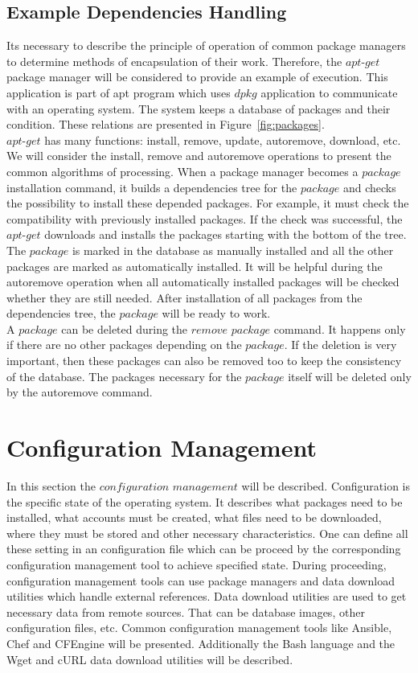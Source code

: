 \subsection*{Example Dependencies Handling}\label{subs:depapt}
Its necessary to describe the principle of operation of common package managers to determine methods of encapsulation of their work.
Therefore, the $apt$-$get$ package manager will be considered to provide an example of execution.
This application is part of \gls{apt} program which uses $dpkg$ application to communicate with an operating system.
The system keeps a database of packages and their condition.
These relations are presented in Figure~\ref{fig:packages}.\\
$apt$-$get$ has many functions: install, remove, update, autoremove, download, etc.
We will consider the install, remove and autoremove operations to present the common algorithms of processing.
When a package manager becomes a $package$ installation command, it builds a dependencies tree for the $package$ and checks the possibility to install these depended packages.
For example, it must check the compatibility with previously installed packages. 
If the check was successful, the $apt$-$get$ downloads and installs the packages starting with the bottom of the tree.
The $package$ is marked in the database as manually installed and all the other packages are marked as automatically installed. 
It will be helpful during the autoremove operation when all automatically installed packages will be checked whether they are still needed.
After installation of all packages from the dependencies tree, the $package$ will be ready to work.\\
A $package$ can be deleted during the $remove$ $package$ command.
It happens only if there are no other packages depending on the $package$. 
If the deletion is very important, then these packages can also be removed too to keep the consistency of the database. 
The packages necessary for the $package$ itself will be deleted only by the autoremove command.

\section{Configuration Management}\label{sec:confman}
In this section the $configuration$ $management$ will be described. 
Configuration is the specific state of the operating system.
It describes what packages need to be installed, what accounts must be created, what files need to be downloaded, where they must be stored and other necessary characteristics.
One can define all these setting in an configuration file which can be proceed by the corresponding configuration management tool to achieve specified state.
During proceeding, configuration management tools can use package managers and data download utilities which handle external references.
Data download utilities are used to get necessary data from remote sources.
That can be database images, other configuration files, etc.
Common configuration management tools like Ansible, Chef and CFEngine will be presented.
Additionally the Bash language and the Wget and cURL data download utilities will be described. 

